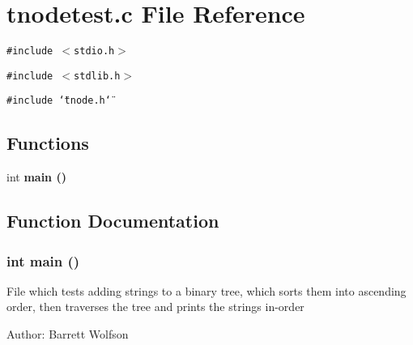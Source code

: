 \section{tnodetest.c File Reference}
\label{tnodetest_8c}
{\tt \#include $<$stdio.h$>$}\par
{\tt \#include $<$stdlib.h$>$}\par
{\tt \#include \char`\"{}tnode.h\char`\"{}}\par
\subsection*{Functions}
\begin{CompactItemize}
\item 
int \bf{main} ()
\end{CompactItemize}


\subsection{Function Documentation}
\subsubsection{\setlength{\rightskip}{0pt plus 5cm}int main ()}\label{tnodetest_8c_e66f6b31b5ad750f1fe042a706a4e3d4}


File which tests adding strings to a binary tree, which sorts them into ascending order, then traverses the tree and prints the strings in-order \begin{Desc}
\item[Author:]Barrett Wolfson \end{Desc}
